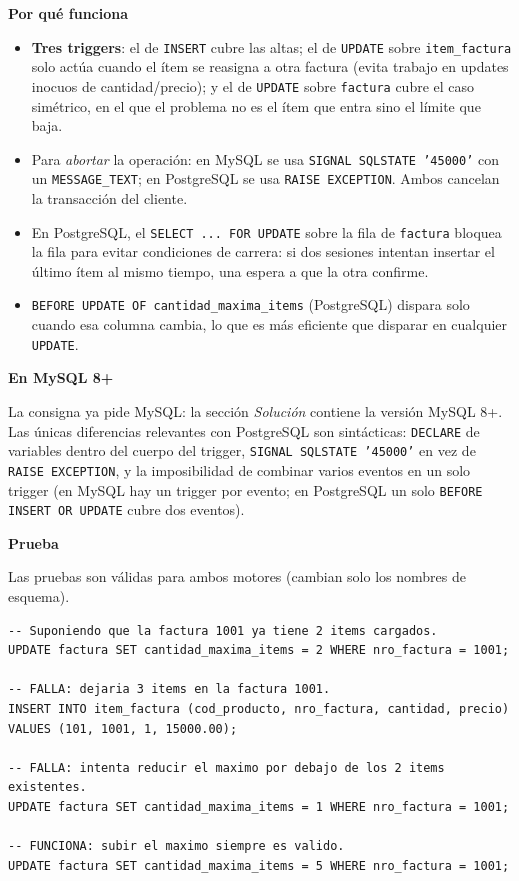 \documentclass[11pt,a4paper]{article}
\newcommand{\itemcabecera}[1]{\noindent\textbf{#1}\par\medskip}
\newcommand{\bloquePorque}{\itemcabecera{Por qu\'e funciona}}
\newcommand{\bloqueMySQL}{\itemcabecera{En MySQL 8+}}
\newcommand{\bloquePrueba}{\itemcabecera{Prueba}}
\begin{document}
\bloquePorque

\begin{itemize}
    \item \textbf{Tres triggers}: el de \texttt{INSERT} cubre las altas; el de \texttt{UPDATE} sobre \texttt{item\_factura} solo actúa cuando el ítem se reasigna a otra factura (evita trabajo en updates inocuos de cantidad/precio); y el de \texttt{UPDATE} sobre \texttt{factura} cubre el caso simétrico, en el que el problema no es el ítem que entra sino el límite que baja.
    \item Para \emph{abortar} la operación: en MySQL se usa \texttt{SIGNAL SQLSTATE '45000'} con un \texttt{MESSAGE\_TEXT}; en PostgreSQL se usa \texttt{RAISE EXCEPTION}. Ambos cancelan la transacción del cliente.
    \item En PostgreSQL, el \texttt{SELECT ... FOR UPDATE} sobre la fila de \texttt{factura} bloquea la fila para evitar condiciones de carrera: si dos sesiones intentan insertar el último ítem al mismo tiempo, una espera a que la otra confirme.
    \item \texttt{BEFORE UPDATE OF cantidad\_maxima\_items} (PostgreSQL) dispara solo cuando esa columna cambia, lo que es más eficiente que disparar en cualquier \texttt{UPDATE}.
\end{itemize}

\bloqueMySQL

La consigna ya pide MySQL: la sección \textit{Solución} contiene la versión MySQL 8+. Las únicas diferencias relevantes con PostgreSQL son sintácticas: \texttt{DECLARE} de variables dentro del cuerpo del trigger, \texttt{SIGNAL SQLSTATE '45000'} en vez de \texttt{RAISE EXCEPTION}, y la imposibilidad de combinar varios eventos en un solo trigger (en MySQL hay un trigger por evento; en PostgreSQL un solo \texttt{BEFORE INSERT OR UPDATE} cubre dos eventos).

\bloquePrueba

Las pruebas son válidas para ambos motores (cambian solo los nombres de esquema).

\begin{lstlisting}
-- Suponiendo que la factura 1001 ya tiene 2 items cargados.
UPDATE factura SET cantidad_maxima_items = 2 WHERE nro_factura = 1001;

-- FALLA: dejaria 3 items en la factura 1001.
INSERT INTO item_factura (cod_producto, nro_factura, cantidad, precio)
VALUES (101, 1001, 1, 15000.00);

-- FALLA: intenta reducir el maximo por debajo de los 2 items existentes.
UPDATE factura SET cantidad_maxima_items = 1 WHERE nro_factura = 1001;

-- FUNCIONA: subir el maximo siempre es valido.
UPDATE factura SET cantidad_maxima_items = 5 WHERE nro_factura = 1001;
\end{lstlisting}
\end{document}
